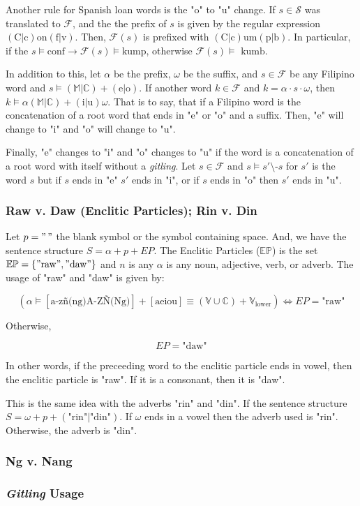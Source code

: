 Another rule for Spanish loan words is the "o" to "u" change. If \(s\in \mathcal{S}\)
was translated to \(\mathcal{F}\), and the the prefix of \(s\) is given by the
regular expression \((\text{C}|\text{c})\text{on}(\text{f}|\text{v})\). Then,
\(\mathcal{F}(s)\) is prefixed with
\((\text{C}|\text{c})\text{um}(\text{p}|\text{b})\). In particular, if the
\(s \models \text{conf} \rightarrow \mathcal{F}(s) \models \text{kump}\),
otherwise \(\mathcal{F}(s) \models \text{ kumb}\).

In addition to this, let \(\alpha\) be the prefix, \(\omega\) be the suffix, and
\(s\in\mathcal{F}\) be any Filipino word and \(s \models \mathbb{(M|C)}+(\text{e}|\text{o})\).
If another word \(k\in\mathcal{F}\) and \(k=\alpha\cdot s\cdot\omega\), then
\(k\models\alpha\mathbb{(M|C)}+(\text{i}|\text{u})\omega\). That is to say, that
if a Filipino word is the concatenation of a root word that ends in "e" or "o" and
a suffix. Then, "e" will change to "i" and "o" will change to "u".

Finally, "e" changes to "i" and "o" changes to "u" if the word is a concatenation
of a root word with itself without a \textit{gitling}. Let
\(s\in\mathcal{F}\) and \(s\models s'\text{\textbackslash}\text{-}s\)
for \(s'\) is the word \(s\) but if \(s\) ends in "e" \(s'\) ends in "i", or if
\(s\) ends in "o" then \(s'\) ends in "u".

\subsubsection{Raw v. Daw (Enclitic Particles); Rin v. Din}

Let \(p = "\,"\) the blank symbol or the symbol containing space. And, we have the
sentence structure \(S = \alpha + p + EP\). The Enclitic Particles (\(\mathbb{EP}\))
is the set \(\mathbb{EP} = \{"\text{raw}", "\text{daw}"\}\) and \(n\) is any \(\alpha\)
is any noun, adjective, verb, or adverb. The usage of "raw" and "daw" is given by:

\[
    \left(\alpha \models \left[\text{a-zñ(ng)A-ZÑ(Ng)}\right]+\left[\text{aeiou}\right] \equiv (\mathbb{V}\cup\mathbb{C}) + \mathbb{V}_\text{lower}\right)
    \Longleftrightarrow EP = \text{"raw"}
\]

Otherwise,

\[
    EP = \text{"daw"}
\]

In other words, if the preceeding word to the enclitic particle ends in vowel,
then the enclitic particle is "raw". If it is a consonant, then it is "daw".

This is the same idea with the adverbs "rin" and "din". If the sentence structure
\(S = \omega + p + (\text{"rin"}|\text{"din"})\). If \(\omega\) ends in a vowel
then the adverb used is "rin". Otherwise, the adverb is "din".

\subsubsection{Ng v. Nang}

\subsubsection{\textit{Gitling} Usage}